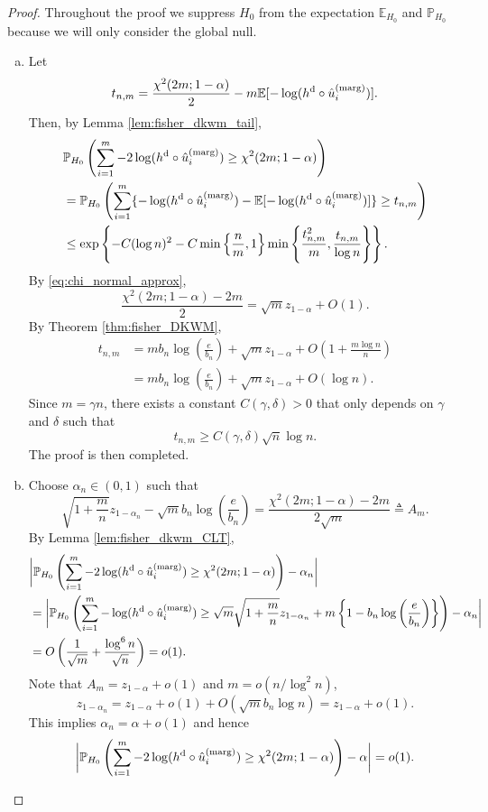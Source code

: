 \documentclass[11pt]{article}
\def\E{\mathbb{E}}
\def\marg{\textnormal{(marg)}}
\def\dkwm{\textnormal{d}}
\renewcommand{\P}{\mathbb{P}}
\newcommand{\lb}{\left(}
\newcommand{\rb}{\right)}
\begin{document}
\begin{proof}
Throughout the proof we suppress $H_0$ from the expectation $\E_{H_0}$ and $\P_{H_0}$ because we will only consider the global null.   
  \begin{enumerate}[(a)]
  \item Let
    \[t_{n, m} = \frac{\chi^2(2m; 1 - \alpha)}{2} - m\E[-\log(h^\dkwm \circ \hat{u}_i^\marg)].\]
    Then, by Lemma \ref{lem:fisher_dkwm_tail},
    \begin{align*}
      &\P_{H_0}\lb \sum_{i=1}^{m} -2\log(h^\dkwm \circ \hat{u}_i^\marg)\ge \chi^2(2m; 1 - \alpha)\rb\\
      & = \P_{H_0}\lb \sum_{i=1}^{m} \{-\log(h^\dkwm \circ \hat{u}_i^\marg) - \E[-\log(h^\dkwm \circ \hat{u}_i^\marg)]\}\ge t_{n, m}\rb\\
      & \le \exp\left\{-C(\log n)^2 - C\min\left\{\frac{n}{m}, 1\right\}\min\left\{\frac{t_{n,m}^2}{m}, \frac{t_{n,m}}{\log n}\right\}\right\}.
    \end{align*}
    By \eqref{eq:chi_normal_approx},
    \[\frac{\chi^2(2m; 1 - \alpha) - 2m}{2} = \sqrt{m}z_{1-\alpha} + O\lb 1\rb.\]
    By Theorem \ref{thm:fisher_DKWM},
    \begin{align*}
      t_{n, m} &= mb_{n}\log\lb \frac{e}{b_n}\rb + \sqrt{m}z_{1-\alpha} + O\lb 1 + \frac{m\log n}{n}\rb\\
               & = mb_{n}\log\lb \frac{e}{b_n}\rb + \sqrt{m}z_{1-\alpha} + O\lb\log n\rb.
    \end{align*}
    Since $m = \gamma n$, there exists a constant $C(\gamma, \delta) > 0$ that only depends on $\gamma$ and $\delta$ such that
    \[t_{n, m}\ge C(\gamma, \delta)\sqrt{n}\log n.\]
    The proof is then completed.
  \item Choose $\alpha_n\in (0, 1)$ such that
    \[\sqrt{1 + \frac{m}{n}}z_{1 - \alpha_{n}} - \sqrt{m}b_n\log\lb\frac{e}{b_n}\rb = \frac{\chi^2(2m; 1 - \alpha) - 2m}{2\sqrt{m}} \triangleq A_m.\]
    By Lemma \ref{lem:fisher_dkwm_CLT},
    \begin{align*}
      &\bigg|\P_{H_0}\lb\sum_{i=1}^{m} -2\log(h^\dkwm \circ \hat{u}_i^\marg)\ge \chi^2(2m; 1 - \alpha)\rb - \alpha_n\bigg|\\
      & = \bigg|\P_{H_0}\lb\sum_{i=1}^{m} -\log(h^\dkwm \circ \hat{u}_i^\marg)\ge \sqrt{m}\sqrt{1 + \frac{m}{n}}z_{1- \alpha_n} + m \left\{ 1 - b_n\log\lb\frac{e}{b_n}\rb\right\}\rb - \alpha_n\bigg|\\
      & = O\lb \frac{1}{\sqrt{m}} + \frac{\log^6 n}{\sqrt{n}}\rb = o(1).
    \end{align*}
    Note that $A_{m} = z_{1-\alpha} + o(1)$ and $m = o(n / \log^2 n)$,
    \[z_{1-\alpha_n} = z_{1- \alpha} + o(1) + O(\sqrt{m} b_n\log n) = z_{1 - \alpha} + o(1).\]
    This implies $\alpha_n = \alpha + o(1)$ and hence
    \[\bigg|\P_{H_0}\lb\sum_{i=1}^{m} -2\log(h^\dkwm \circ \hat{u}_i^\marg)\ge \chi^2(2m; 1 - \alpha)\rb - \alpha\bigg| = o(1).\]
  \end{enumerate}
\end{proof}
\end{document}
